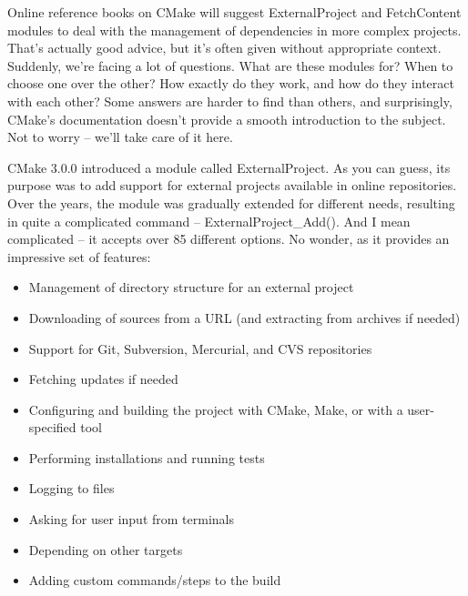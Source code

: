 
Online reference books on CMake will suggest ExternalProject and FetchContent modules to deal with the management of dependencies in more complex projects. That's actually good advice, but it's often given without appropriate context. Suddenly, we're facing a lot of questions. What are these modules for? When to choose one over the other? How exactly do they work, and how do they interact with each other? Some answers are harder to find than others, and surprisingly, CMake's documentation doesn't provide a smooth introduction to the subject. Not to worry – we'll take care of it here.


CMake 3.0.0 introduced a module called ExternalProject. As you can guess, its purpose was to add support for external projects available in online repositories. Over the years, the module was gradually extended for different needs, resulting in quite a complicated command – ExternalProject\_Add(). And I mean complicated – it accepts over 85 different options. No wonder, as it provides an impressive set of features:

\begin{itemize}
\item 
Management of directory structure for an external project

\item 
Downloading of sources from a URL (and extracting from archives if needed)

\item 
Support for Git, Subversion, Mercurial, and CVS repositories

\item 
Fetching updates if needed

\item 
Configuring and building the project with CMake, Make, or with a user-specified tool

\item 
Performing installations and running tests

\item 
Logging to files

\item 
Asking for user input from terminals

\item 
Depending on other targets

\item 
Adding custom commands/steps to the build
\end{itemize}

